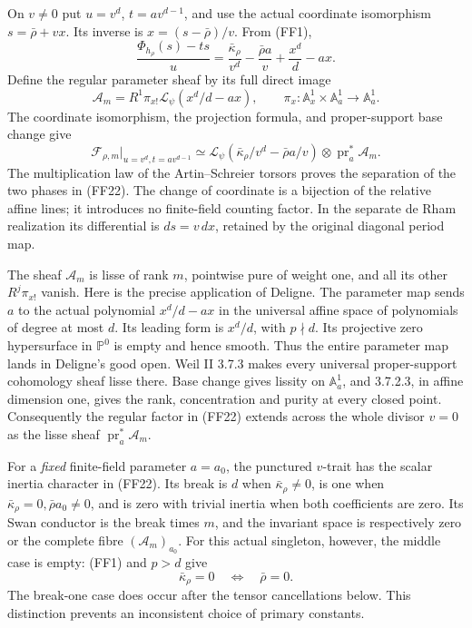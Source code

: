 \documentclass[11pt,a4paper]{article}
\theoremstyle{definition}
\begin{document}
On \(v\ne0\) put \(u=v^d\), \(t=av^{d-1}\), and use the actual
coordinate isomorphism \(s=\bar\rho+vx\).  Its inverse is
\(x=(s-\bar\rho)/v\).  From (FF1),
\[
 \frac{\Phi_{h_\rho}(s)-ts}{u}
     =\frac{\bar\kappa_\rho}{v^d}
         -\frac{\bar\rho a}{v}+\frac{x^d}{d}-ax.        \tag{FF20}
\]
Define the regular parameter sheaf by its full direct image
\[
 \mathcal A_m=R^1\pi_{x!}\mathcal L_\psi(x^d/d-ax),
        \qquad \pi_x:\mathbb A^1_x\times\mathbb A^1_a
                                  \longrightarrow\mathbb A^1_a .
                                                               \tag{FF21}
\]
The coordinate isomorphism, the projection formula, and
proper-support base change give
\[
 \mathcal F_{\rho,m}|_{u=v^d,t=av^{d-1}}
   \simeq\mathcal L_\psi
       (\bar\kappa_\rho/v^d-\bar\rho a/v)
                            \otimes\operatorname{pr}_a^*\mathcal A_m.
                                                               \tag{FF22}
\]
The multiplication law of the Artin--Schreier torsors proves the
separation of the two phases in (FF22).  The change of coordinate is
a bijection of the relative affine lines; it introduces no finite-field
counting factor.  In the separate de Rham realization its differential
is \(ds=v\,dx\), retained by the original diagonal period map.

The sheaf \(\mathcal A_m\) is lisse of rank \(m\), pointwise pure of
weight one, and all its other \(R^j\pi_{x!}\) vanish.
Here is the precise application of Deligne.  The parameter map sends
\(a\) to the actual polynomial \(x^d/d-ax\) in the universal affine
space of polynomials of degree at most \(d\).  Its leading form is
\(x^d/d\), with \(p\nmid d\).  Its projective zero hypersurface in
\(\mathbb P^0\) is empty and hence smooth.  Thus the entire parameter
map lands in Deligne's good open.  Weil II 3.7.3 makes every universal
proper-support cohomology sheaf lisse there.  Base change gives lissity
on \(\mathbb A^1_a\), and 3.7.2.3, in affine dimension one, gives
the rank, concentration and purity at every closed point.
Consequently the regular factor in (FF22) extends across the whole
divisor \(v=0\) as the lisse sheaf
\(\operatorname{pr}_a^*\mathcal A_m\).

For a \emph{fixed} finite-field parameter \(a=a_0\), the punctured
\(v\)-trait has the scalar inertia character in (FF22).
Its break is \(d\) when \(\bar\kappa_\rho\ne0\), is one when
\(\bar\kappa_\rho=0,\bar\rho a_0\ne0\), and is zero with trivial
inertia when both coefficients are zero.  Its Swan conductor is
the break times \(m\), and the invariant space is respectively zero
or the complete fibre \((\mathcal A_m)_{a_0}\).
For this actual singleton, however, the middle case is empty:
(FF1) and \(p>d\) give
\[
       \bar\kappa_\rho=0\quad\Longleftrightarrow\quad\bar\rho=0.
                                                               \tag{FF23}
\]
The break-one case does occur after the tensor cancellations below.
This distinction prevents an inconsistent choice of primary constants.
\end{document}
